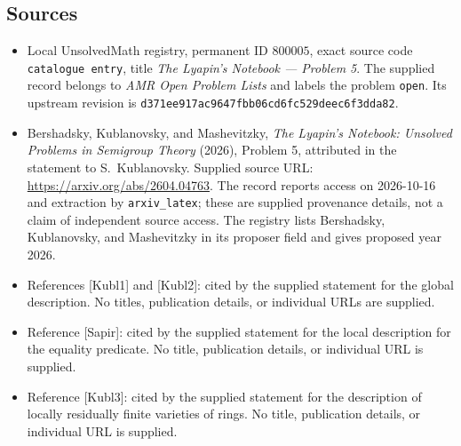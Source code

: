 \documentclass[11pt]{article}
\begin{document}
\subsection{Sources}
\begin{itemize}
\item Local UnsolvedMath registry, permanent ID \(800005\), exact source code \texttt{catalogue entry}, title \emph{The Lyapin's Notebook --- Problem 5}. The supplied record belongs to \emph{AMR Open Problem Lists} and labels the problem \texttt{open}. Its upstream revision is \texttt{d371ee917ac9647fbb06cd6fc529deec6f3dda82}.
\item Bershadsky, Kublanovsky, and Mashevitzky, \emph{The Lyapin's Notebook: Unsolved Problems in Semigroup Theory} (2026), Problem 5, attributed in the statement to S.~Kublanovsky. Supplied source URL: \url{https://arxiv.org/abs/2604.04763}. The record reports access on 2026-10-16 and extraction by \texttt{arxiv\_latex}; these are supplied provenance details, not a claim of independent source access. The registry lists Bershadsky, Kublanovsky, and Mashevitzky in its proposer field and gives proposed year 2026.
\item References [Kubl1] and [Kubl2]: cited by the supplied statement for the global description. No titles, publication details, or individual URLs are supplied.
\item Reference [Sapir]: cited by the supplied statement for the local description for the equality predicate. No title, publication details, or individual URL is supplied.
\item Reference [Kubl3]: cited by the supplied statement for the description of locally residually finite varieties of rings. No title, publication details, or individual URL is supplied.
\end{itemize}
\end{document}
